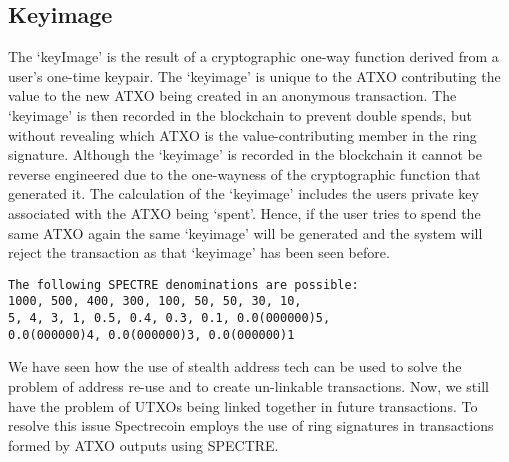 \subsection{Keyimage}
The ‘keyImage’ is the result of a cryptographic one-way function derived
from a user’s one-time keypair. The ‘keyimage’ is unique to the ATXO
contributing the value to the new ATXO being created in an anonymous
transaction. The ‘keyimage’ is then recorded in the blockchain to prevent
double spends, but without revealing which ATXO is the value-contributing
member in the ring signature. Although the ‘keyimage’ is recorded in the
blockchain it cannot be reverse engineered due to the one-wayness of the
cryptographic function that generated it. The calculation of the ‘keyimage’
includes the users private key associated with the ATXO being ‘spent’.
Hence, if the user tries to spend the same ATXO again the same ‘keyimage’
will be generated and the system will reject the transaction as that
‘keyimage’ has been seen before.



\begin{lstlisting}
The following SPECTRE denominations are possible:
1000, 500, 400, 300, 100, 50, 50, 30, 10,
5, 4, 3, 1, 0.5, 0.4, 0.3, 0.1, 0.0(000000)5,
0.0(000000)4, 0.0(000000)3, 0.0(000000)1
\end{lstlisting}



We have seen how the use of stealth address tech can be used to solve the
problem of address re-use and to create un-linkable transactions. Now, we
still have the problem of UTXOs being linked together in future transactions.
To resolve this issue Spectrecoin employs the use of ring signatures in
transactions formed by ATXO outputs using SPECTRE.

